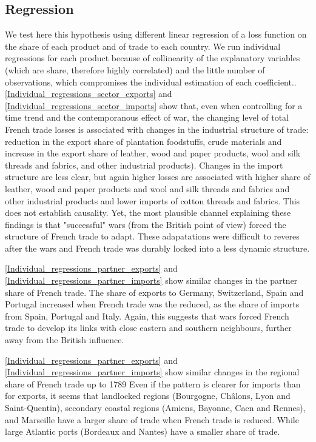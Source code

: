 \documentclass[12pt,a4paper,notitlepage,english]{article}
\begin{document}
\subsection{Regression}
We test here this hypothesis using different linear regression of a loss function on the share of each product and of trade to each country.
We run individual regressions for each product because of collinearity of the explanatory variables (which are share, therefore highly correlated) and the little number of observations, which compromises the individual estimation of each coefficient..
\ref{Individual_regressions_sector_exports} and \ref{Individual_regressions_sector_imports} show that, even when controlling for a time trend and the contemporanous effect of war, the changing level of total French trade losses is associated with changes in the industrial structure of trade: reduction in the export share of plantation foodstuffs, crude materials and increase in the export share of leather, wood and paper products, wool and silk threads and fabrics, and other industrial products).
Changes in the import structure are less clear, but again higher losses are associated with higher share of leather, wood and paper products and wool and silk threads and fabrics and other industrial products and lower imports of cotton threads and fabrics.
This does not establish causality.
Yet, the most plausible channel explaining these findings is that "successful" wars (from the British point of view) forced the structure of French trade to adapt.
These adapatations were difficult to reveres after the wars and French trade was durably locked into a less dynamic structure.

\ref{Individual_regressions_partner_exports} and \ref{Individual_regressions_partner_imports} show similar changes in the partner share of French trade.
The share of exports to Germany, Switzerland, Spain and Portugal increased when French trade was the reduced, as the share of imports from Spain, Portugal and Italy. 
Again, this suggests that wars forced French trade to develop its links with close eastern and southern neighbours, further away from the British influence.

\ref{Individual_regressions_partner_exports} and \ref{Individual_regressions_partner_imports} show similar changes in the regional share of French trade up to 1789
Even if the pattern is clearer for imports than for exports, it seems that landlocked regions (Bourgogne, Châlons, Lyon and Saint-Quentin), secondary coastal regions (Amiens, Bayonne, Caen and Rennes), and Marseille have a larger share of trade when French trade is reduced.
While large Atlantic ports (Bordeaux and Nantes) have a smaller share of trade.
\end{document}
